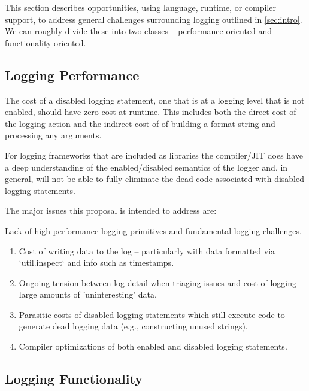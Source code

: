 This section describes opportunities, using language, runtime, or compiler support, to address 
general challenges surrounding logging outlined in \autoref{sec:intro}. We can roughly divide 
these into two classes -- performance oriented and functionality oriented. 

\subsection{Logging Performance}
\label{subsec:performancedesign}

\begin{design}
The cost of a disabled logging statement, one that is at a logging level that is not enabled, should 
have zero-cost at runtime. This includes both the direct cost of the logging action and the indirect cost 
of of building a format string and processing any arguments. 
\end{design}

For logging frameworks that are included as libraries the compiler/JIT does have a deep understanding 
of the enabled/disabled semantics of the logger and, in general, will not be able to fully eliminate 
the dead-code associated with disabled logging statements.





The major issues this proposal is intended to address are:

\noindent
Lack of high performance logging primitives and fundamental logging challenges.
\begin{enumerate}
 \item Cost of writing data to the log -- particularly with data formatted via 
    `util.inspect` and info such as timestamps.
 \item Ongoing tension between log detail when triaging issues and cost of logging 
    large amounts of 'uninteresting' data.
\item Parasitic costs of disabled logging statements which still execute code to 
    generate dead logging data (e.g., constructing unused strings).
\item Compiler optimizations of both enabled and disabled logging statements.
\end{enumerate}

\subsection{Logging Functionality}
\label{subsec:functionalitydesign}

